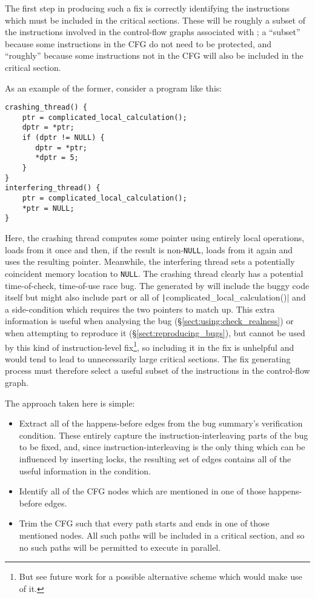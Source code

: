 The first step in producing such a fix is correctly identifying the
instructions which must be included in the critical sections.  These
will be roughly a subset of the instructions involved in the
control-flow graphs associated with \StateMachines; a ``subset''
because some instructions in the CFG do not need to be protected, and
``roughly'' because some instructions not in the CFG will also be
included in the critical section.

As an example of the former, consider a program like this:

\begin{verbatim}
crashing_thread() {
    ptr = complicated_local_calculation();
    dptr = *ptr;
    if (dptr != NULL) {
       dptr = *ptr;
       *dptr = 5;
    }
}
interfering_thread() {
    ptr = complicated_local_calculation();
    *ptr = NULL;
}
\end{verbatim}

Here, the crashing thread computes some pointer using entirely local
operations, loads from it once and then, if the result is
non-\texttt{NULL}, loads from it again and uses the resulting pointer.
Meanwhile, the interfering thread sets a potentially coincident memory
location to \texttt{NULL}.  The crashing thread clearly has a
potential time-of-check, time-of-use race bug.  The {\StateMachines}
generated by {\technique} will include the buggy code itself but might
also include part or all of \texttt|complicated\_local\_calculation()|
and a side-condition which requires the two pointers to match up.
This extra information is useful when analysing the bug
(\S\ref{sect:using:check_realness}) or when attempting to reproduce it
(\S\ref{sect:reproducing_bugs}), but cannot be used by this kind
of instruction-level fix\footnote{But see future work for a possible
  alternative scheme which would make use of it.}, so including it in
the fix is unhelpful and would tend to lead to unnecessarily large
critical sections.  The fix generating process must therefore select a
useful subset of the instructions in the control-flow graph.

The approach taken here is simple:

\begin{itemize}
\item
  Extract all of the happens-before edges from the bug summary's
  verification condition.  These entirely capture the
  instruction-interleaving parts of the bug to be fixed, and, since
  instruction-interleaving is the only thing which can be influenced
  by inserting locks, the resulting set of edges contains all of the
  useful information in the condition.
\item
  Identify all of the CFG nodes which are mentioned in one of those
  happens-before edges.
\item
  Trim the CFG such that every path starts and ends in one of those
  mentioned nodes.  All such paths will be included in a critical
  section, and so no such paths will be permitted to execute in
  parallel.
\end{itemize}

